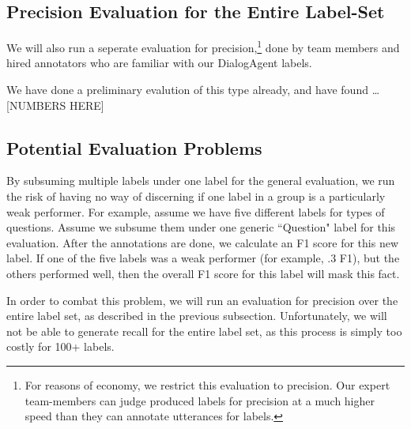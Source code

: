 \subsection{Precision Evaluation for the Entire Label-Set}
We will also run a seperate evaluation for precision,\footnote{For reasons of economy, we restrict this evaluation to precision. Our expert team-members can judge produced labels for precision at a much higher speed than they can annotate utterances for labels.} done by team members and hired annotators who are familiar with our DialogAgent labels.

We have done a preliminary evalution of this type already, and have found \ldots [NUMBERS HERE]

\subsection{Potential Evaluation Problems}
By subsuming multiple labels under one label for the general evaluation, we run the risk of having no way of discerning if one label in a group is a particularly weak performer. For example, assume we have five different labels for types of questions. Assume we subsume them under one generic ``Question" label for this evaluation. After the annotations are done, we calculate an F1 score for this new label. If one of the five labels was a weak performer (for example, .3 F1), but the others performed well, then the overall F1 score for this label will mask this fact. 

In order to combat this problem, we will run an evaluation for precision over the entire label set, as described in the previous subsection. Unfortunately, we will not be able to generate recall for the entire label set, as this process is simply too costly for 100+ labels.


